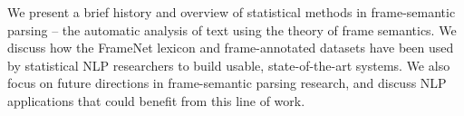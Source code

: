 We present a brief history and overview of statistical methods in frame-semantic parsing -- the automatic analysis of text using the theory of frame semantics. We discuss how the FrameNet lexicon and frame-annotated datasets have been used by statistical NLP researchers to build usable, state-of-the-art systems. We also focus on future directions in frame-semantic parsing research, and discuss NLP applications that could benefit from this line of work.
